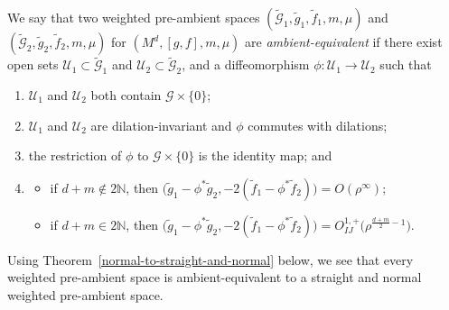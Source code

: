 \begin{Definition}
{\sloppy
We say that two weighted pre-ambient spaces $(\widetilde{\mathcal{G}}_{1}, \widetilde{g}_{1},\widetilde{f}_1,m,\mu)$ and $(\widetilde{\mathcal{G}}_{2}, \widetilde{g}_{2}, \widetilde{f}_2,\allowbreak m,\mu)$ for $(M^d,[g,f],m,\mu)$ are \emph{ambient-equivalent} if there exist open sets $\mathcal{U}_{1} \subset \widetilde{\mathcal{G}}_{1}$ and $\mathcal{U}_{2} \subset \widetilde{\mathcal{G}}_{2}$, and a diffeomorphism $\phi\colon \mathcal{U}_{1} \rightarrow \mathcal{U}_{2}$ such that}
\begin{enumerate}[label=$(\roman*)$]\itemsep=0pt
\item $\mathcal{U}_{1}$ and $\mathcal{U}_{2}$ both contain $\mathcal{G} \times\{0\}$;

\item $\mathcal{U}_{1}$ and $\mathcal{U}_{2}$ are dilation-invariant and $\phi$ commutes with dilations;

\item the restriction of $\phi$ to $\mathcal{G} \times\{0\}$ is the identity map; and

\item \begin{itemize}
\item[$(a)$] if $d+m\notin 2\mathbb{N}$, then $\big(\widetilde{g}_{1}-\phi^{*} \widetilde{g}_{2}, -2(\widetilde{f}_1-\phi^*\widetilde{f}_2)\big)=O(\rho^\infty)$;
\item[$(b)$] if $d+m\in 2\mathbb{N}$, then $\big(\widetilde{g}_{1}-\phi^{*} \widetilde{g}_{2}, -2(\widetilde{f}_1-\phi^*\widetilde{f}_2)\big)=O_{I J}^{1,+}\big(\rho^{\frac{d+m}{2}-1}\big)$.
\end{itemize}
\end{enumerate}
\end{Definition}

Using Theorem~\ref{normal-to-straight-and-normal} below, we see that every weighted pre-ambient space is ambient-equivalent to a straight and normal weighted pre-ambient space.

